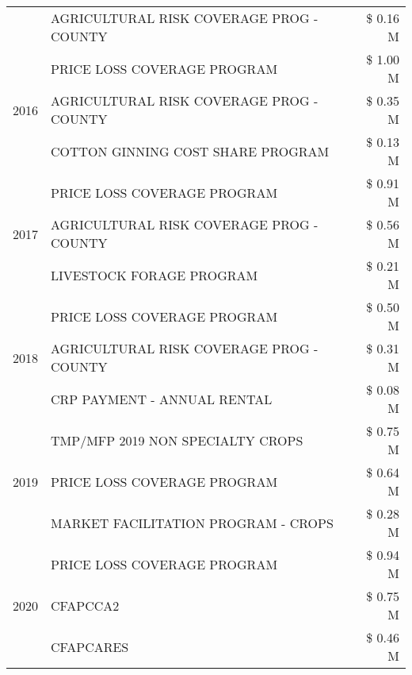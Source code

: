 \begin{tabular}{llr}
 & AGRICULTURAL RISK COVERAGE PROG - COUNTY & \$ 0.16 M \\
\cline{1-3}
\multirow[t]{3}{*}{2016} & PRICE LOSS COVERAGE PROGRAM                   & \$ 1.00 M \\
 & AGRICULTURAL RISK COVERAGE PROG - COUNTY      & \$ 0.35 M \\
 & COTTON GINNING COST SHARE PROGRAM             & \$ 0.13 M \\
\cline{1-3}
\multirow[t]{3}{*}{2017} & PRICE LOSS COVERAGE PROGRAM & \$ 0.91 M \\
 & AGRICULTURAL RISK COVERAGE PROG - COUNTY & \$ 0.56 M \\
 & LIVESTOCK FORAGE PROGRAM & \$ 0.21 M \\
\cline{1-3}
\multirow[t]{3}{*}{2018} & PRICE LOSS COVERAGE PROGRAM & \$ 0.50 M \\
 & AGRICULTURAL RISK COVERAGE PROG - COUNTY & \$ 0.31 M \\
 & CRP PAYMENT - ANNUAL RENTAL & \$ 0.08 M \\
\cline{1-3}
\multirow[t]{3}{*}{2019} & TMP/MFP 2019 NON SPECIALTY CROPS & \$ 0.75 M \\
 & PRICE LOSS COVERAGE PROGRAM & \$ 0.64 M \\
 & MARKET FACILITATION PROGRAM - CROPS & \$ 0.28 M \\
\cline{1-3}
\multirow[t]{3}{*}{2020} & PRICE LOSS COVERAGE PROGRAM & \$ 0.94 M \\
 & CFAPCCA2 & \$ 0.75 M \\
 & CFAPCARES & \$ 0.46 M \\
\cline{1-3}
\bottomrule
\end{tabular}
